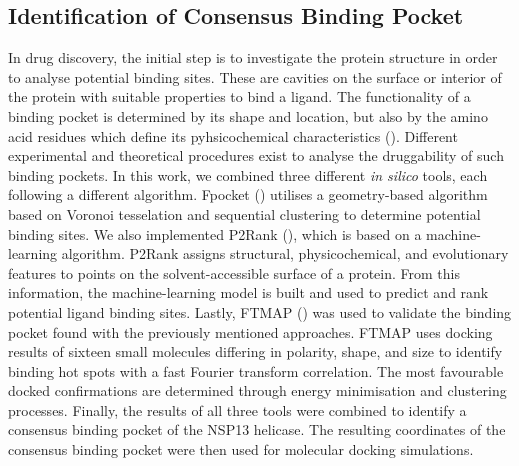 \documentclass[11pt, letterpaper, titlepage]{article}
\begin{document}
\subsection{Identification of Consensus Binding Pocket}
In drug discovery, the initial step is to investigate the protein structure in order to analyse potential binding sites. These are cavities on the surface or interior of the protein with suitable properties to bind a ligand. The functionality of a binding pocket is determined by its shape and location, but also by the amino acid residues which define its pyhsicochemical characteristics (\cite{Stank_2016}). 
Different experimental and theoretical procedures exist to analyse the druggability of such binding pockets. In this work, we combined three different \textit{in silico} tools, each following a different algorithm. Fpocket (\cite{package_Fpocket}) utilises a geometry-based algorithm based on Voronoi tesselation and sequential clustering to determine potential binding sites. We also implemented P2Rank (\cite{package_P2Rank, package_PrankWeb, package_PrankWeb3}), which is based on a machine-learning algorithm. 
P2Rank assigns structural, physicochemical, and evolutionary features to points on the solvent-accessible surface of a protein. From this information, the machine-learning model is built and used to predict and rank potential ligand binding sites. Lastly, FTMAP (\cite{package_FTMAP}) was used to validate the binding pocket found with the previously mentioned approaches. FTMAP uses docking results of sixteen small molecules differing in polarity, shape, and size to identify binding hot spots with a fast Fourier transform correlation. The most favourable docked confirmations are determined through energy minimisation and clustering processes.
Finally, the results of all three tools were combined to identify a consensus binding pocket of the NSP13 helicase. The resulting coordinates of the consensus binding pocket were then used for molecular docking simulations. 
\end{document}
